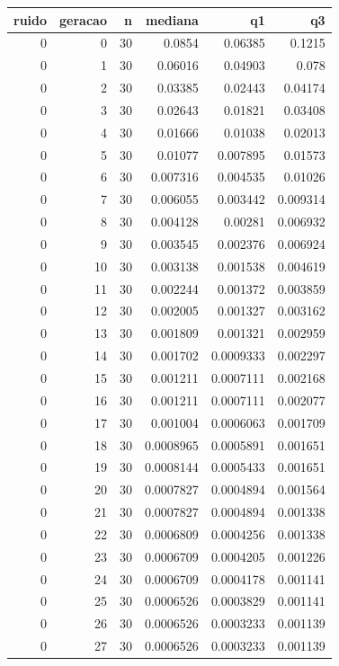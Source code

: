 \begin{tabular}{rrrrrr}
\toprule
ruido & geracao & n & mediana & q1 & q3 \\
\midrule
0 & 0 & 30 & 0.0854 & 0.06385 & 0.1215 \\
0 & 1 & 30 & 0.06016 & 0.04903 & 0.078 \\
0 & 2 & 30 & 0.03385 & 0.02443 & 0.04174 \\
0 & 3 & 30 & 0.02643 & 0.01821 & 0.03408 \\
0 & 4 & 30 & 0.01666 & 0.01038 & 0.02013 \\
0 & 5 & 30 & 0.01077 & 0.007895 & 0.01573 \\
0 & 6 & 30 & 0.007316 & 0.004535 & 0.01026 \\
0 & 7 & 30 & 0.006055 & 0.003442 & 0.009314 \\
0 & 8 & 30 & 0.004128 & 0.00281 & 0.006932 \\
0 & 9 & 30 & 0.003545 & 0.002376 & 0.006924 \\
0 & 10 & 30 & 0.003138 & 0.001538 & 0.004619 \\
0 & 11 & 30 & 0.002244 & 0.001372 & 0.003859 \\
0 & 12 & 30 & 0.002005 & 0.001327 & 0.003162 \\
0 & 13 & 30 & 0.001809 & 0.001321 & 0.002959 \\
0 & 14 & 30 & 0.001702 & 0.0009333 & 0.002297 \\
0 & 15 & 30 & 0.001211 & 0.0007111 & 0.002168 \\
0 & 16 & 30 & 0.001211 & 0.0007111 & 0.002077 \\
0 & 17 & 30 & 0.001004 & 0.0006063 & 0.001709 \\
0 & 18 & 30 & 0.0008965 & 0.0005891 & 0.001651 \\
0 & 19 & 30 & 0.0008144 & 0.0005433 & 0.001651 \\
0 & 20 & 30 & 0.0007827 & 0.0004894 & 0.001564 \\
0 & 21 & 30 & 0.0007827 & 0.0004894 & 0.001338 \\
0 & 22 & 30 & 0.0006809 & 0.0004256 & 0.001338 \\
0 & 23 & 30 & 0.0006709 & 0.0004205 & 0.001226 \\
0 & 24 & 30 & 0.0006709 & 0.0004178 & 0.001141 \\
0 & 25 & 30 & 0.0006526 & 0.0003829 & 0.001141 \\
0 & 26 & 30 & 0.0006526 & 0.0003233 & 0.001139 \\
0 & 27 & 30 & 0.0006526 & 0.0003233 & 0.001139 \\

\end{tabular}
